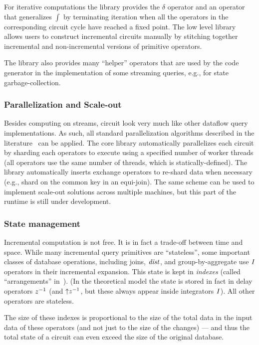 For iterative computations the library provides the $\delta$ operator
and an operator that generalizes $\int$ by terminating iteration when
all the operators in the corresponding circuit cycle have reached a
fixed point.  The low level library allows users to construct
incremental circuits manually by stitching together incremental and
non-incremental versions of primitive operators.

The library also provides many ``helper'' operators that are used by
the code generator in the implementation of some streaming queries,
e.g., for state garbage-collection.

\subsubsection{Parallelization and Scale-out}

Besides computing on streams, \dbsp circuit look very much like other
dataflow query implementations.  As such, all standard parallelization
algorithms described in the literature~\cite{Graefe-sigmod90} can be
applied.  The core library automatically parallelizes each circuit by
sharding each operators to execute using a specified number of worker
threads (all operators use the same number of threads, which is
statically-defined).  The library automatically inserts exchange
operators to re-shard data when necessary (e.g., shard on the common
key in an equi-join).  The same scheme can be used to implement
scale-out solutions across multiple machines, but this part of the
runtime is still under development.

\subsubsection{State management}\label{sec:state-management}

Incremental computation is not free.  It is in fact a trade-off
between time and space.  While many incremental query primitives are
``stateless'', some important classes of database operations,
including joins, $\mathit{dist}$, and group-by-aggregate use $\mathit{I}$
operators in their incremental expansion.  This state is kept in
\emph{indexes} (called ``arrangements'' in~\cite{mcsherry-vldb20}).
(In the \dbsp theoretical model the state is stored in fact in delay
operators $z^{-1}$ (and ${\uparrow}z^{-1}$, but these always appear inside
integrators $\mathit{I}$).  All other operators are stateless.

The size of these indexes is proportional to the size of the total
data in the input data of these operators (and not just to the size of
the changes) --- and thus the total state of a circuit can even exceed
the size of the original database.

